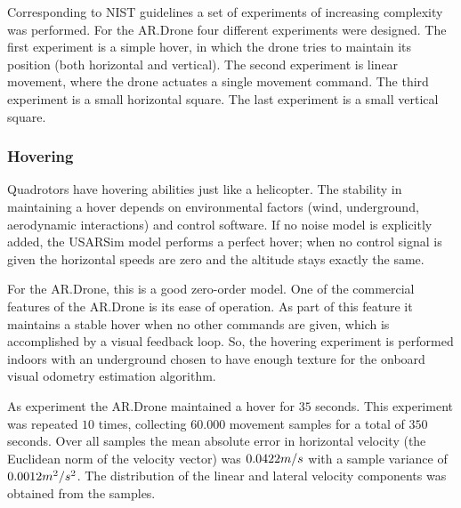 Corresponding to NIST guidelines \cite{Jacoff2010STM}
a set of experiments of increasing complexity was performed. For the AR.Drone
four different experiments were designed.
The first experiment is a simple hover, in which the drone tries to maintain its position (both horizontal and vertical). The second experiment is linear movement, where the drone actuates a single movement command. The third experiment is a small horizontal square. The last experiment is a small vertical square.

\subsubsection{Hovering}

Quadrotors have hovering abilities just like a helicopter. The stability in maintaining a hover depends
on environmental factors (wind, underground, aerodynamic interactions) and control software.
If no noise model is explicitly added, the USARSim model performs a perfect hover; when no control signal is given the
horizontal speeds are zero and the altitude stays exactly the same.

For the AR.Drone, this is a good zero-order model. One of the commercial features of the AR.Drone is its ease of operation. As part of this feature it
maintains a stable hover when no other commands are given, which is accomplished by a visual feedback loop.
So, the hovering experiment is performed  
indoors
with an underground chosen to have enough texture for the onboard visual odometry estimation algorithm.

As experiment the AR.Drone maintained a hover for $35$ seconds. This experiment was repeated $10$ times,
collecting $60.000$ movement samples for a total of $350$ seconds. Over all samples the mean absolute error in horizontal
velocity (the Euclidean norm of the velocity vector) was $0.0422\small{m/s}$ with a sample variance of $0.0012\small{m^2/s^2}$. The distribution of the linear and lateral velocity components was obtained from the samples.

